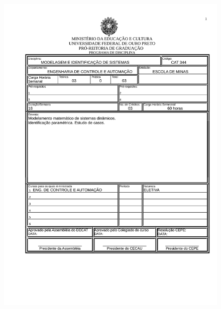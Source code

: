 \begin{figure}[p]
	\centering 
	\includegraphics[scale=0.7]{capitulos/anexo1-programas-disciplina/eg18.pdf}
\end{figure}

